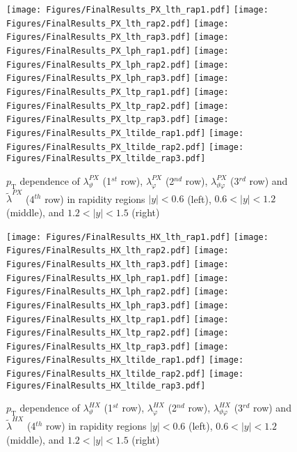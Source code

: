 \documentclass[12pt]{article}
\newcommand{\pT}{p_\mathrm{T}}
\newcommand{\absy}{\left |  y \right |}
\newcommand{\lamthHX}{\lambda^{\scriptscriptstyle HX}_\vartheta}
\newcommand{\lamphHX}{\lambda^{\scriptscriptstyle HX}_\varphi}
\newcommand{\lamthphHX}{\lambda^{\scriptscriptstyle HX}_{\vartheta \varphi}}
\newcommand{\lamtildeHX}{\tilde{\lambda}^{\scriptscriptstyle HX}}
\newcommand{\lamthPX}{\lambda^{\scriptscriptstyle PX}_\vartheta}
\newcommand{\lamphPX}{\lambda^{\scriptscriptstyle PX}_\varphi}
\newcommand{\lamthphPX}{\lambda^{\scriptscriptstyle PX}_{\vartheta \varphi}}
\newcommand{\lamtildePX}{\tilde{\lambda}^{\scriptscriptstyle PX}}
\begin{document}



\begin{figure}[htbp]
\centering
\texttt{[image: Figures/FinalResults\_PX\_lth\_rap1.pdf]}
\texttt{[image: Figures/FinalResults\_PX\_lth\_rap2.pdf]}
\texttt{[image: Figures/FinalResults\_PX\_lth\_rap3.pdf]}
\texttt{[image: Figures/FinalResults\_PX\_lph\_rap1.pdf]}
\texttt{[image: Figures/FinalResults\_PX\_lph\_rap2.pdf]}
\texttt{[image: Figures/FinalResults\_PX\_lph\_rap3.pdf]}
\texttt{[image: Figures/FinalResults\_PX\_ltp\_rap1.pdf]}
\texttt{[image: Figures/FinalResults\_PX\_ltp\_rap2.pdf]}
\texttt{[image: Figures/FinalResults\_PX\_ltp\_rap3.pdf]}
\texttt{[image: Figures/FinalResults\_PX\_ltilde\_rap1.pdf]}
\texttt{[image: Figures/FinalResults\_PX\_ltilde\_rap2.pdf]}
\texttt{[image: Figures/FinalResults\_PX\_ltilde\_rap3.pdf]}
\caption{$\pT$ dependence of $\lamthPX$
(1$^{st}$ row), $\lamphPX$ (2$^{nd}$ row), $\lamthphPX$ (3$^{rd}$ row) and 
$\lamtildePX$ (4$^{th}$ row) in rapidity regions $\absy<0.6$ (left), 
$0.6<\absy<1.2$ (middle), and $1.2<\absy<1.5$ (right)}
\end{figure}
\clearpage







\begin{figure}[htbp]
\centering
\texttt{[image: Figures/FinalResults\_HX\_lth\_rap1.pdf]}
\texttt{[image: Figures/FinalResults\_HX\_lth\_rap2.pdf]}
\texttt{[image: Figures/FinalResults\_HX\_lth\_rap3.pdf]}
\texttt{[image: Figures/FinalResults\_HX\_lph\_rap1.pdf]}
\texttt{[image: Figures/FinalResults\_HX\_lph\_rap2.pdf]}
\texttt{[image: Figures/FinalResults\_HX\_lph\_rap3.pdf]}
\texttt{[image: Figures/FinalResults\_HX\_ltp\_rap1.pdf]}
\texttt{[image: Figures/FinalResults\_HX\_ltp\_rap2.pdf]}
\texttt{[image: Figures/FinalResults\_HX\_ltp\_rap3.pdf]}
\texttt{[image: Figures/FinalResults\_HX\_ltilde\_rap1.pdf]}
\texttt{[image: Figures/FinalResults\_HX\_ltilde\_rap2.pdf]}
\texttt{[image: Figures/FinalResults\_HX\_ltilde\_rap3.pdf]}
\caption{$\pT$ dependence of $\lamthHX$
(1$^{st}$ row), $\lamphHX$ (2$^{nd}$ row), $\lamthphHX$ (3$^{rd}$ row) and 
$\lamtildeHX$ (4$^{th}$ row) in rapidity regions $\absy<0.6$ (left), 
$0.6<\absy<1.2$ (middle), and $1.2<\absy<1.5$ (right)}
\end{figure}
\clearpage
\end{document}
